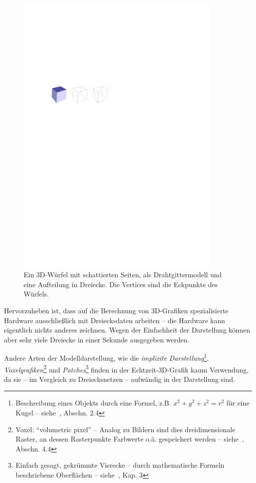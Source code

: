 \documentclass[twoside,a4paper,fleqn,12pt]{book}
\begin{document}
\begin{figure}[h]
  \centering
  \includegraphics[width=10cm]{drahtgitter}
  \caption{Ein 3D-Würfel mit schattierten Seiten, als Drahtgittermodell und eine Aufteilung in Dreiecke. Die Vertices
  sind die Eckpunkte des Würfels.}
  \label{fig:wirecube}
\end{figure}

Hervorzuheben ist, dass auf die Berechnung von 3D-Grafiken spezialisierte Hardware 
ausschließlich mit Dreiecksdaten arbeiten -- die Hardware kann eigentlich nichts anderes zeichnen. Wegen der Einfachheit der Darstellung
können aber sehr viele Dreiecke in einer Sekunde ausgegeben werden. 

Andere Arten der Modelldarstellung, wie die \emph{implizite Darstellung}\footnote{Beschreibung eines Objekts durch eine Formel,
z.B. $x^2 + y^2 + z^2 = r^2$ für eine Kugel -- siehe~\cite{watt_de}, Abschn. 2.4}, \emph{Voxelgrafiken}\footnote{Voxel: ``volumetric pixel'' --
Analog zu Bildern sind dies dreidimensionale Raster, an dessen Rasterpunkte Farbwerte o.ä. gespeichert werden -- siehe~\cite{watt_de}, Abschn. 4.4}
und \emph{Patches}\footnote{Einfach gesagt, gekrümmte Vierecke -- durch mathematische Formeln beschriebene Oberflächen -- siehe~\cite{watt_de}, Kap. 3}
finden in der Echtzeit-3D-Grafik kaum Verwendung, da sie -- im Vergleich zu Dreiecksnetzen -- aufwändig in der Darstellung sind.
\end{document}
